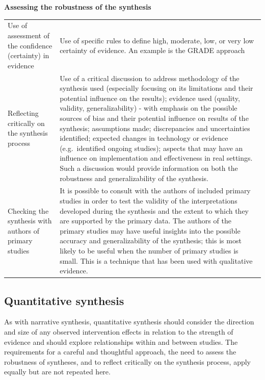 \documentclass[
  11pt,
  a4paper,
  DIV=11,
  numbers=noendperiod]{scrreprt}
\begin{document}
\textbf{Assessing the robustness of the synthesis}

\begin{longtable}[]{@{}
  >{\raggedright\arraybackslash}p{}
  >{\raggedright\arraybackslash}p{}@{}}
\toprule\noalign{}
\endhead
\bottomrule\noalign{}
\endlastfoot
Use of assessment of the confidence (certainty) in evidence & Use of
specific rules to define high, moderate, low, or very low certainty of
evidence. An example is the GRADE approach \\
Reflecting critically on the synthesis process & Use of a critical
discussion to address methodology of the synthesis used (especially
focusing on its limitations and their potential influence on the
results); evidence used (quality, validity, generalizability) - with
emphasis on the possible sources of bias and their potential influence
on results of the synthesis; assumptions made; discrepancies and
uncertainties identified; expected changes in technology or evidence
(e.g.~identified ongoing studies); aspects that may have an influence on
implementation and effectiveness in real settings. Such a discussion
would provide information on both the robustness and generalizability of
the synthesis. \\
Checking the synthesis with authors of primary studies & It is possible
to consult with the authors of included primary studies in order to test
the validity of the interpretations developed during the synthesis and
the extent to which they are supported by the primary data. The authors
of the primary studies may have useful insights into the possible
accuracy and generalizability of the synthesis; this is most likely to
be useful when the number of primary studies is small. This is a
technique that has been used with qualitative evidence. \\
\end{longtable}

\subsection{Quantitative synthesis}\label{quantitative-synthesis}

As with narrative synthesis, quantitative synthesis should consider the
direction and size of any observed intervention effects in relation to
the strength of evidence and should explore relationships within and
between studies. The requirements for a careful and thoughtful approach,
the need to assess the robustness of syntheses, and to reflect
critically on the synthesis process, apply equally but are not repeated
here.
\end{document}
